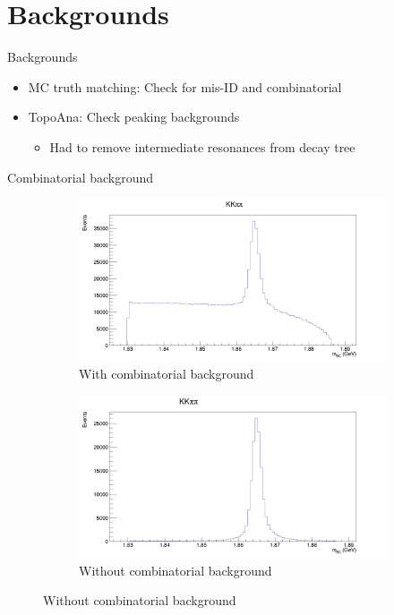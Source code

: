 \documentclass{beamer}
\begin{document}
\section{Backgrounds}
\begin{frame}{Backgrounds}
  \begin{itemize}
    \setlength\itemsep{2em}
    \item{MC truth matching: Check for mis-ID and combinatorial}
    \item{TopoAna: Check peaking backgrounds}
    \begin{itemize}
      \item{Had to remove intermediate resonances from decay tree}
    \end{itemize}
  \end{itemize}
\end{frame}

\begin{frame}{Combinatorial background}
  \begin{figure}
    \centering
    \begin{subfigure}{0.5\textwidth}
      \centering
      \includegraphics[width=\textwidth]{KKpipiMBCWithCombinatorial.png}
      \caption{With combinatorial background}
    \end{subfigure}%
    \begin{subfigure}{0.5\textwidth}
      \centering
      \includegraphics[width=\textwidth]{KKpipiMBCWithoutCombinatorial.png}
      \caption{Without combinatorial background}
    \end{subfigure}
  \end{figure}
\end{frame}
\end{document}
